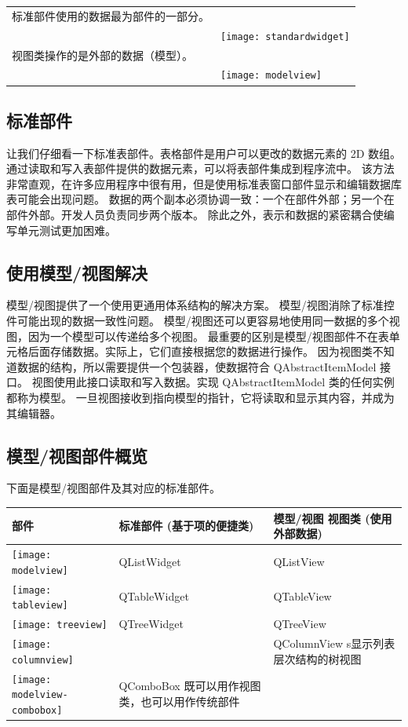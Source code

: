 \begin{longtable}[l]{|l|m{25em}|}
\hline
标准部件使用的数据最为部件的一部分。\\
&
\texttt{[image: standardwidget]} \\ 
\hline	
视图类操作的是外部的数据（模型）。\\
&
\texttt{[image: modelview]} \\ 
\hline	
\end{longtable}

\subsection{标准部件}

让我们仔细看一下标准表部件。表格部件是用户可以更改的数据元素的 2D 数组。
通过读取和写入表部件提供的数据元素，可以将表部件集成到程序流中。
该方法非常直观，在许多应用程序中很有用，但是使用标准表窗口部件显示和编辑数据库表可能会出现问题。
数据的两个副本必须协调一致：一个在部件外部；另一个在部件外部。开发人员负责同步两个版本。
除此之外，表示和数据的紧密耦合使编写单元测试更加困难。

\subsection{使用模型/视图解决}

模型/视图提供了一个使用更通用体系结构的解决方案。
模型/视图消除了标准控件可能出现的数据一致性问题。
模型/视图还可以更容易地使用同一数据的多个视图，因为一个模型可以传递给多个视图。
最重要的区别是模型/视图部件不在表单元格后面存储数据。实际上，它们直接根据您的数据进行操作。
因为视图类不知道数据的结构，所以需要提供一个包装器，使数据符合 QAbstractItemModel 接口。
视图使用此接口读取和写入数据。实现 QAbstractItemModel 类的任何实例都称为模型。
一旦视图接收到指向模型的指针，它将读取和显示其内容，并成为其编辑器。

\subsection{模型/视图部件概览}

下面是模型/视图部件及其对应的标准部件。

\begin{longtable}[l]{|l|m{15em}|m{10em}|}
\hline
部件 & 标准部件 (基于项的便捷类) & 模型/视图 视图类 (使用外部数据) \\ 
\hline
\texttt{[image: modelview]}  
&
QListWidget
&
QListView  \\
\hline
\texttt{[image: tableview]}  
&
QTableWidget	
&
QTableView \\
\hline
\texttt{[image: treeview]}  
&
QTreeWidget	
&
QTreeView  \\
\hline
\texttt{[image: columnview]}  
&

&
QColumnView s显示列表层次结构的树视图  \\
\hline
\texttt{[image: modelview-combobox]}  
&
QComboBox 既可以用作视图类，也可以用作传统部件
&
  \\
\hline
\end{longtable}



